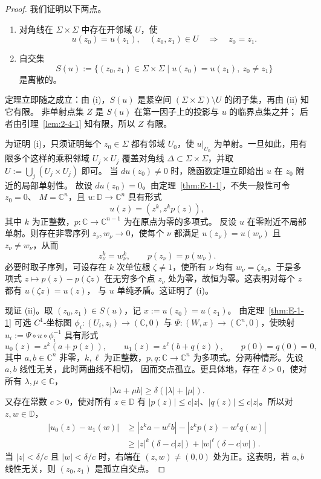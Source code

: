 \begin{proof}
我们证明以下两点。
\begin{enumerate}
  \item[(i)] 对角线在 $\Sigma\times\Sigma$ 中存在开邻域 $U$，使
    \[
      u(z_0)=u(z_1),\quad(z_0,z_1)\in U\quad\Longrightarrow\quad z_0=z_1.
    \]
  \item[(ii)] 自交集
    \[
      S(u):=\{(z_0,z_1)\in\Sigma\times\Sigma\mid
        u(z_0)=u(z_1),\ z_0\ne z_1\}
    \]
    是离散的。
\end{enumerate}
定理立即随之成立：由 (i)，$S(u)$ 是紧空间
$(\Sigma\times\Sigma)\setminus U$ 的闭子集，再由 (ii) 知它有限。
非单射点集 $Z$ 是 $S(u)$ 在第一因子上的投影与 $u$ 的临界点集之并；
后者由引理~\ref{lem:2-4-1} 知有限，所以 $Z$ 有限。

为证明 (i)，只须证明每个 $z_0\in\Sigma$ 都有邻域 $U_0$，使 $u|_{U_0}$
为单射。一旦如此，用有限多个这样的乘积邻域 $U_j\times U_j$ 覆盖对角线
$\Delta\subset\Sigma\times\Sigma$，并取 $U:=\bigcup_j(U_j\times U_j)$ 即可。
当 $du(z_0)\ne0$ 时，隐函数定理立即给出 $u$ 在 $z_0$ 附近的局部单射性。
故设 $du(z_0)=0$。由定理~\ref{thm:E-1-1}，不失一般性可令 $z_0=0$、
$M=\mathbb C^n$，且 $u:\mathbb D\to\mathbb C^n$ 具有形式
\[
  u(z)=(z^k,z^kp(z)),
\]
其中 $k$ 为正整数，$p:\mathbb C\to\mathbb C^{n-1}$ 为在原点为零的多项式。
反设 $u$ 在零附近不局部单射。则存在非零序列 $z_\nu,w_\nu\to0$，使每个 $\nu$
都满足 $u(z_\nu)=u(w_\nu)$ 且 $z_\nu\ne w_\nu$，从而
\[
  z_\nu^k=w_\nu^k,\qquad p(z_\nu)=p(w_\nu).
\]
必要时取子序列，可设存在 $k$ 次单位根 $\zeta\ne1$，使所有 $\nu$ 均有
$w_\nu=\zeta z_\nu$。于是多项式 $z\mapsto p(z)-p(\zeta z)$ 在无穷多个点
$z_\nu$ 处为零，故恒为零。这表明对每个 $z$ 都有 $u(\zeta z)=u(z)$，
与 $u$ 单纯矛盾。这证明了 (i)。

现证 (ii)。取 $(z_0,z_1)\in S(u)$，记 $x:=u(z_0)=u(z_1)$。
由定理~\ref{thm:E-1-1} 可选 $C^1$-坐标图
$\phi_i:(U_i,z_i)\to(\mathbb C,0)$ 与
$\Psi:(W,x)\to(\mathbb C^n,0)$，使映射
$u_i:=\Psi\circ u\circ\phi_i^{-1}$ 具有形式
\[
  u_0(z)=z^k(a+p(z)),\qquad
  u_1(z)=z^\ell(b+q(z)),\qquad p(0)=q(0)=0,
\]
其中 $a,b\in\mathbb C^n$ 非零，$k,\ell$ 为正整数，$p,q:\mathbb C\to
\mathbb C^n$ 为多项式。分两种情形。先设 $a,b$ 线性无关，此时两曲线不相切，
因而交点孤立。更具体地，存在 $\delta>0$，使对所有 $\lambda,\mu\in\mathbb C$，
\[
  |\lambda a+\mu b|\ge\delta(|\lambda|+|\mu|).
\]
又存在常数 $c>0$，使对所有 $z\in\mathbb D$ 有
$|p(z)|\le c|z|$、$|q(z)|\le c|z|$。所以对 $z,w\in\mathbb D$，
\begin{align*}
  |u_0(z)-u_1(w)|
  &\ge |z^ka-w^\ell b|-|z^kp(z)-w^\ell q(w)|\\
  &\ge |z|^k(\delta-c|z|)+|w|^\ell(\delta-c|w|).
\end{align*}
当 $|z|<\delta/c$ 且 $|w|<\delta/c$ 时，右端在 $(z,w)\ne(0,0)$
处为正。这表明，若 $a,b$ 线性无关，则 $(z_0,z_1)$ 是孤立自交点。


\end{proof}
